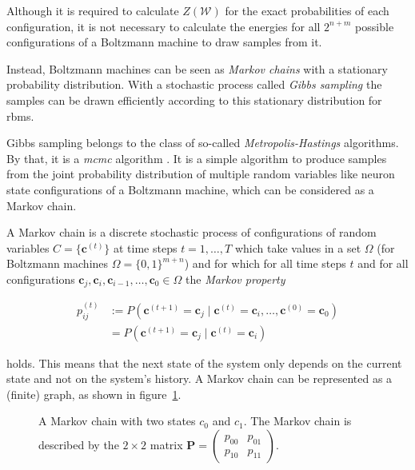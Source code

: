 Although it is required to calculate $Z(\mathcal{W})$ for the exact probabilities of each configuration,
it is not necessary to calculate the energies for all $2^{n+m}$ possible configurations of 
a Boltzmann machine to draw samples from it.

Instead, Boltzmann machines can be seen as \textit{Markov chains} with a stationary probability
distribution. With a stochastic process called \textit{Gibbs sampling} the samples can be drawn efficiently according to this stationary distribution for \gls{rbm}s.

Gibbs sampling belongs to the class of so-called \textit{Metropolis-Hastings} algorithms. By that, it is 
a \textit{\gls{mcmc}} algorithm \cite{hastings1970monte}. It is a simple algorithm to produce samples from the joint probability distribution of multiple random variables like neuron state configurations
of a Boltzmann machine, which can be considered as a Markov chain.

A Markov chain is a discrete stochastic process of configurations of random variables $C=\{\bm{c}^{(t)}\}$
at time steps $t=1, \dots, T$ which take values in a set $\Omega$ (for Boltzmann machines 
$\Omega=\{0,1\}^{m+n}$) and for which for all time steps $t$ and for all configurations 
$\bm{c}_j, \bm{c}_i, \bm{c}_{i-1}, \dots, \bm{c}_0 \in \Omega$ the \textit{Markov property}

\begin{align}
    p_{ij}^{(t)} &:= P(\bm{c}^{(t+1)} = \bm{c}_j \mid \bm{c}^{(t)} = \bm{c}_i, \dots, \bm{c}^{(0)} = \bm{c}_0) \\
                 & = P(\bm{c}^{(t+1)} = \bm{c}_j \mid \bm{c}^{(t)} = \bm{c}_i) 
\end{align}

holds. This means that the next state of the system only depends on the current state and not on the system's history. A Markov chain can be represented as a (finite) graph, as shown in figure~\ref{fig:markov}.

\begin{figure}[H]
    \centering
    \caption[Markov Chain with Two States]{A Markov chain with two states $c_0$ and $c_1$. The Markov chain is 
described by the $2 \times 2$ matrix $\bm{P}=\begin{pmatrix} p_{00} & p_{01} \\ p_{10} & p_{11} \end{pmatrix}$.}
    \label{fig:markov}
\end{figure}

